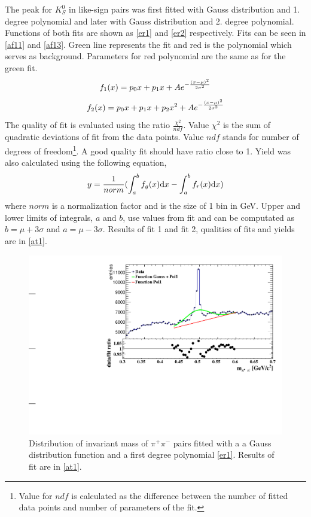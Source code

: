 \FloatBarrier
The peak for $K^0_S$ in like-sign pairs was first fitted with Gauss distribution and 1. degree polynomial and later with Gauss distribution and 2. degree polynomial. Functions of both fits are shown as \autoref{er1} and \autoref{er2} respectively. Fits can be seen in \autoref{af11} and \autoref{af13}. Green line represents the fit and red is the polynomial which serves as background. Parameters for red polynomial are the same as for the green fit. 
\newline
\begin{equation}
\centering
f_1(x) = p_0x + p_1x + Ae^{-\frac{(x-\mu)^2}{2\sigma^2}}
\label{er1}
\end{equation}
\begin{equation}
\centering
f_2(x) = p_0x + p_1x + p_2x^2 + Ae^{-\frac{(x-\mu)^2}{2\sigma^2}}
\label{er2}
\end{equation}
The quality of fit is evaluated using the ratio $\frac{\chi^2}{ndf}$. Value $\chi^2$ is the sum of quadratic deviations of fit from the data points. Value $ndf$ stands for number of degrees of freedom\footnote{Value for $ndf$ is calculated as the difference between the number of fitted data points and number of parameters of the fit.}. A good quality fit should have ratio close to 1. Yield was also calculated using the following equation,
\begin{equation}
\centering
y = \frac{1}{norm}(\int^{b}_{a}f_g(x)\mathrm{d}x - \int^{b}_{a}f_r(x)\mathrm{d}x)
\label{er6}
\end{equation}
where $norm$ is a normalization factor and is the size of 1 bin in GeV. Upper and lower  limits of integrals, $a$ and $b$, use values from fit and can be computated as $b=\mu + 3\sigma$ and $a=\mu - 3\sigma$. Results of fit 1 and fit 2, qualities of fits and yields are in \autoref{at1}. 
\FloatBarrier
\begin{figure}[ht]
    \centering
    \includegraphics[width=1\textwidth]{figures/K0sFitLinear.pdf}
    \caption[Distribution of invariant pion pairs fitted with Gauss distribution and 1. degree polynomial]{Distribution of invariant mass of $\pi^+ \pi^-$ pairs fitted with a a Gauss distribution function and a first degree polynomial \autoref{er1}. Results of fit are in \autoref{at1}.}
    \label{af11}
\end{figure}
\FloatBarrier

